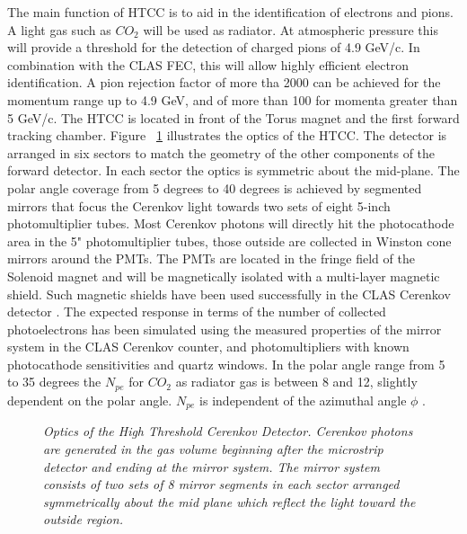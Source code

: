 




The main function of HTCC is to aid in the identification of electrons and 
pions. A light gas such as $CO_2$ will be used as radiator. At atmospheric 
pressure this will provide a threshold for the detection of charged pions of 
4.9 GeV/c. In combination with the CLAS FEC, this will allow highly efficient 
electron identification. A pion rejection factor of more tha 2000 can be 
achieved 
for the momentum range up to 4.9 GeV, and of  more than 100  for momenta 
greater than
5 GeV/c. The HTCC is located in front of the Torus magnet and the first forward
tracking chamber. 
Figure ~\ref{fig:htcc_optics}
illustrates the optics of the HTCC. The detector is arranged in six sectors 
to match the geometry of the other components of the forward detector. 
In each sector the optics is symmetric about the mid-plane. The polar angle 
coverage from 5 degrees to 40 degrees is achieved by segmented mirrors that 
focus the Cerenkov light towards two sets of eight 5-inch photomultiplier tubes. 
Most Cerenkov photons will directly hit the photocathode area in the 5" 
photomultiplier tubes, those outside are collected in Winston cone mirrors 
around the PMTs. The PMTs are located in the fringe field of the Solenoid 
magnet and will be magnetically isolated with a multi-layer magnetic shield. 
Such magnetic shields have been used successfully in the CLAS Cerenkov detector
. The expected response in terms of the number of collected photoelectrons
 has been simulated using the measured properties of the mirror system in the 
CLAS Cerenkov counter, and photomultipliers with known photocathode 
sensitivities and quartz windows. In the polar angle range from 5 to 35 degrees the 
$N_{pe}$  for $CO_2$  as radiator gas is between 8 and 12, slightly dependent 
on the polar angle. $N_{pe}$ is independent of the azimuthal angle $\phi$ . 


\begin{figure}[tb]
\begin{center}
\caption{\it{\small Optics of the High Threshold Cerenkov Detector.
Cerenkov photons are generated in the gas volume beginning after 
the microstrip detector and ending at the mirror system. 
The mirror system consists of
two sets of 8 mirror segments in each sector arranged symmetrically 
about the mid plane which reflect 
the light toward the outside 
region.}}
\label{fig:htcc_optics}
\end{center}
\end{figure}



















